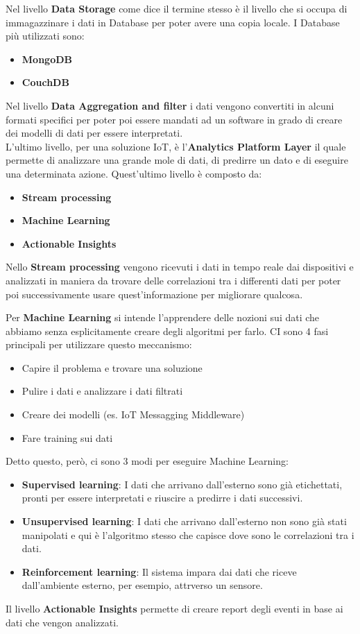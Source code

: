 \documentclass[10pt,a4paper,oneside]{scrbook}
\begin{document}
Nel livello \textbf{Data Storage} come dice il termine stesso è il livello che si occupa di immagazzinare i dati in Database per poter avere una copia locale.
I Database più utilizzati sono:
\begin{itemize}
    \item \textbf{MongoDB}
    \item \textbf{CouchDB}
\end{itemize}
Nel livello \textbf{Data Aggregation and filter} i dati vengono convertiti in alcuni formati specifici per poter poi essere mandati ad un software in grado di creare dei modelli di dati per essere interpretati.\pagebreak
\\
L'ultimo livello, per una soluzione IoT, è l'\textbf{Analytics Platform Layer} il quale permette di analizzare una grande mole di dati, di predirre un dato e di eseguire una determinata azione.
Quest'ultimo livello è composto da:
\begin{itemize}
    \item \textbf{Stream processing}
    \item \textbf{Machine Learning}
    \item \textbf{Actionable Insights}
\end{itemize}
Nello \textbf{Stream processing} vengono ricevuti i dati in tempo reale dai dispositivi e analizzati in maniera da trovare delle correlazioni tra i differenti dati per poter poi successivamente usare quest'informazione per migliorare qualcosa.

Per \textbf{Machine Learning} si intende l'apprendere delle nozioni sui dati che abbiamo senza esplicitamente creare degli algoritmi per farlo. CI sono 4 fasi principali per utilizzare questo meccanismo:
\begin{itemize}
    \item Capire il problema e trovare una soluzione
    \item Pulire i dati e analizzare i dati filtrati
    \item Creare dei modelli (es. IoT Messagging Middleware)
    \item Fare training sui dati
\end{itemize}
Detto questo, però, ci sono 3 modi per eseguire Machine Learning:
\begin{itemize}
    \item \textbf{Supervised learning}: I dati che arrivano dall'esterno sono già etichettati, pronti per essere interpretati e riuscire a predirre i dati successivi.
    \item \textbf{Unsupervised learning}: I dati che arrivano dall'esterno non sono già stati manipolati e qui è l'algoritmo stesso che capisce dove sono le correlazioni tra i dati. 
    \item \textbf{Reinforcement learning}: Il sistema impara dai dati che riceve dall'ambiente esterno, per esempio, attrverso un sensore.
\end{itemize}
Il livello \textbf{Actionable Insights} permette di creare report degli eventi in base ai dati che vengon analizzati.
\end{document}

